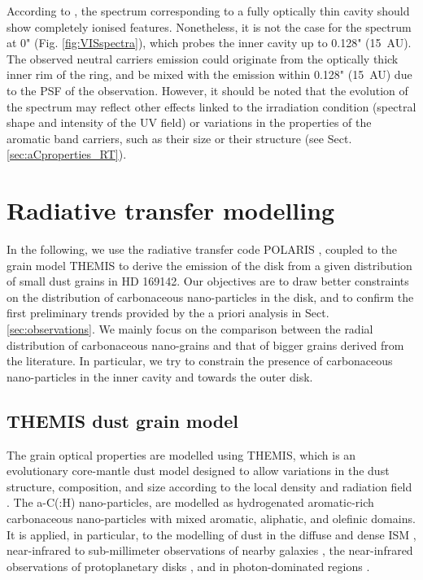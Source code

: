\documentclass{aa}
\begin{document}
According to \citet{Maaskant2014}, the spectrum corresponding to a fully optically thin cavity should show completely ionised features. Nonetheless, it is not the case for the spectrum at 0" (Fig. \ref{fig:VISspectra}), which probes the inner cavity up to 0.128" (15~AU).  The observed neutral carriers emission could originate from the optically thick inner rim of the ring, and be mixed with the emission within 0.128" (15~AU) due to the PSF of the observation. However, it should be noted that the evolution of the spectrum may reflect other effects linked to the irradiation condition (spectral shape and intensity of the UV field) or variations in the properties of the aromatic band carriers, such as their size or their structure (see Sect. \ref{sec:aCproperties_RT}).


\section{Radiative transfer modelling} \label{sec:RTmodels}
 In the following, we use the radiative transfer code POLARIS \citep{Reissl2016}, coupled to the grain model THEMIS \citep{Jones2017} to derive the emission of the disk from a given distribution of small dust grains in HD 169142. Our objectives are to draw better constraints on the distribution of carbonaceous nano-particles in the disk, and to confirm the first preliminary trends provided by the a priori analysis in Sect. \ref{sec:observations}. We mainly focus on the comparison between the radial distribution of carbonaceous nano-grains and that of bigger grains derived from the literature. In particular, we try to constrain the presence of carbonaceous nano-particles in the inner cavity and towards the outer disk.


\subsection{THEMIS dust grain model} \label{sec:THEMIS}
The grain optical properties are modelled using THEMIS, which is an evolutionary core-mantle dust model designed to allow variations in the dust structure, composition, and size according to the local density and radiation field \citep{Jones2013, Jones2017}. The a-C(:H) nano-particles, are modelled as hydrogenated aromatic-rich carbonaceous nano-particles with mixed aromatic, aliphatic, and olefinic domains. It is applied, in particular, to the modelling of dust in the diffuse and dense ISM \citep{Ysard2015, Ysard2016, Saajasto2021}, near-infrared to sub-millimeter observations of nearby galaxies \citep{Chastenet2017, Viaene2019}, the near-infrared observations of protoplanetary disks \citep{Bouteraon_032019, Habart2021}, and in photon-dominated regions \citep{Schirmer2020, Schirmer2021}. 
\end{document}
